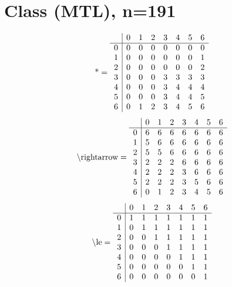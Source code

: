 \documentclass[11pt]{article}
\begin{document}
\section{Class (MTL), n=191}
\[\text{*} = 
\begin{array}{r | r r r r r r r}
 & 0 & 1 & 2 & 3 & 4 & 5 & 6 \\ \hline
0 & 0 & 0 & 0 & 0 & 0 & 0 & 0 \\
1 & 0 & 0 & 0 & 0 & 0 & 0 & 1 \\
2 & 0 & 0 & 0 & 0 & 0 & 0 & 2 \\
3 & 0 & 0 & 0 & 3 & 3 & 3 & 3 \\
4 & 0 & 0 & 0 & 3 & 4 & 4 & 4 \\
5 & 0 & 0 & 0 & 3 & 4 & 4 & 5 \\
6 & 0 & 1 & 2 & 3 & 4 & 5 & 6 \\
\end{array}
\]
\[\text{\textbackslash rightarrow} = 
\begin{array}{r | r r r r r r r}
 & 0 & 1 & 2 & 3 & 4 & 5 & 6 \\ \hline
0 & 6 & 6 & 6 & 6 & 6 & 6 & 6 \\
1 & 5 & 6 & 6 & 6 & 6 & 6 & 6 \\
2 & 5 & 5 & 6 & 6 & 6 & 6 & 6 \\
3 & 2 & 2 & 2 & 6 & 6 & 6 & 6 \\
4 & 2 & 2 & 2 & 3 & 6 & 6 & 6 \\
5 & 2 & 2 & 2 & 3 & 5 & 6 & 6 \\
6 & 0 & 1 & 2 & 3 & 4 & 5 & 6 \\
\end{array}
\]
\[\text{\textbackslash le} = 
\begin{array}{r | r r r r r r r}
 & 0 & 1 & 2 & 3 & 4 & 5 & 6 \\ \hline
0 & 1 & 1 & 1 & 1 & 1 & 1 & 1 \\
1 & 0 & 1 & 1 & 1 & 1 & 1 & 1 \\
2 & 0 & 0 & 1 & 1 & 1 & 1 & 1 \\
3 & 0 & 0 & 0 & 1 & 1 & 1 & 1 \\
4 & 0 & 0 & 0 & 0 & 1 & 1 & 1 \\
5 & 0 & 0 & 0 & 0 & 0 & 1 & 1 \\
6 & 0 & 0 & 0 & 0 & 0 & 0 & 1 \\
\end{array}
\]
\end{document}
